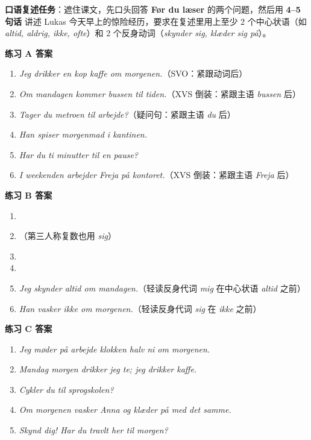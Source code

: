 
\textbf{口语复述任务}：遮住课文，先口头回答 \textbf{Før du læser} 的两个问题，然后用 \textbf{4--5 句话} 讲述 Lukas 今天早上的惊险经历，要求在复述里用上至少 2 个中心状语（如 \textit{altid, aldrig, ikke, ofte}）和 2 个反身动词（\textit{skynder sig, klæder sig på}）。

\begin{answerbox}
\textbf{练习 A 答案}
\begin{enumerate}
  \item \textit{Jeg drikker  en kop kaffe om morgenen.}（SVO：紧跟动词后）
  \item \textit{Om mandagen kommer bussen  til tiden.}（XVS 倒装：紧跟主语 \textit{bussen} 后）
  \item \textit{Tager du  metroen til arbejde?}（疑问句：紧跟主语 \textit{du} 后）
  \item \textit{Han spiser  morgenmad i kantinen.}
  \item \textit{Har du  ti minutter til en pause?}
  \item \textit{I weekenden arbejder Freja  på kontoret.}（XVS 倒装：紧跟主语 \textit{Freja} 后）
\end{enumerate}

\textbf{练习 B 答案}
\begin{enumerate}
  \item {}
  \item {}（第三人称复数也用 \textit{sig}）
  \item {}
  \item {}
  \item \textit{Jeg skynder  altid om mandagen.}（轻读反身代词 \textit{mig} 在中心状语 \textit{altid} 之前）
  \item \textit{Han vasker  ikke om morgenen.}（轻读反身代词 \textit{sig} 在 \textit{ikke} 之前）
\end{enumerate}

\textbf{练习 C 答案}
\begin{enumerate}
  \item \textit{Jeg møder  på arbejde klokken halv ni om morgenen.}
  \item \textit{Mandag morgen drikker jeg  te; jeg drikker  kaffe.}
  \item \textit{Cykler du  til sprogskolen?}
  \item \textit{Om morgenen vasker Anna  og klæder  på med det samme.}
  \item \textit{Skynd dig! Har du  travlt her til morgen?}
\end{enumerate}


\end{answerbox}
